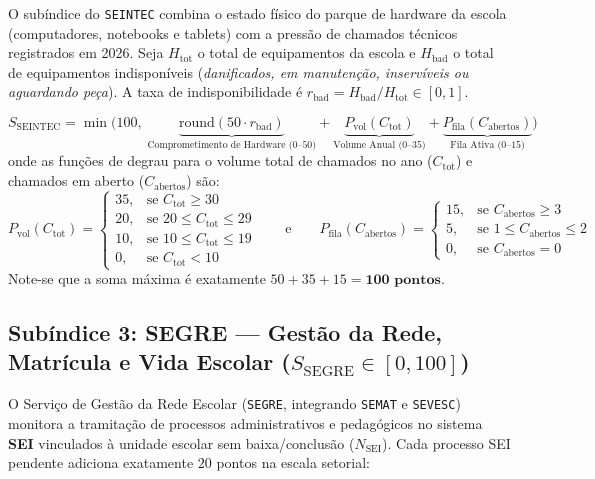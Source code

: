 \documentclass[9pt,a4paper]{extarticle}
\begin{document}
O subíndice do \texttt{SEINTEC} combina o estado físico do parque de hardware da escola (computadores, notebooks e tablets) com a pressão de chamados técnicos registrados em 2026. Seja $H_{\text{tot}}$ o total de equipamentos da escola e $H_{\text{bad}}$ o total de equipamentos indisponíveis (\emph{danificados, em manutenção, inservíveis ou aguardando peça}). A taxa de indisponibilidade é $r_{\text{bad}} = H_{\text{bad}} / H_{\text{tot}} \in [0, 1]$.

\begin{equation}
S_{\text{SEINTEC}} = \min\Big(100, \; \underbrace{\text{round}(50 \cdot r_{\text{bad}})}_{\text{Comprometimento de Hardware (0--50)}} + \underbrace{P_{\text{vol}}(C_{\text{tot}})}_{\text{Volume Anual (0--35)}} + \underbrace{P_{\text{fila}}(C_{\text{abertos}})}_{\text{Fila Ativa (0--15)}}\Big)
\end{equation}
onde as funções de degrau para o volume total de chamados no ano ($C_{\text{tot}}$) e chamados em aberto ($C_{\text{abertos}}$) são:
\begin{equation}
P_{\text{vol}}(C_{\text{tot}}) = \begin{cases} 35, & \text{se } C_{\text{tot}} \ge 30 \\ 20, & \text{se } 20 \le C_{\text{tot}} \le 29 \\ 10, & \text{se } 10 \le C_{\text{tot}} \le 19 \\ 0, & \text{se } C_{\text{tot}} < 10 \end{cases}
\qquad \text{e} \qquad
P_{\text{fila}}(C_{\text{abertos}}) = \begin{cases} 15, & \text{se } C_{\text{abertos}} \ge 3 \\ 5, & \text{se } 1 \le C_{\text{abertos}} \le 2 \\ 0, & \text{se } C_{\text{abertos}} = 0 \end{cases}
\end{equation}
Note-se que a soma máxima é exatamente $50 + 35 + 15 = \mathbf{100\text{ pontos}}$.

\subsection{Subíndice 3: SEGRE --- Gestão da Rede, Matrícula e Vida Escolar ($S_{\text{SEGRE}} \in [0, 100]$)}

O Serviço de Gestão da Rede Escolar (\texttt{SEGRE}, integrando \texttt{SEMAT} e \texttt{SEVESC}) monitora a tramitação de processos administrativos e pedagógicos no sistema \textbf{SEI} vinculados à unidade escolar sem baixa/conclusão ($N_{\text{SEI}}$). Cada processo SEI pendente adiciona exatamente $20$ pontos na escala setorial:
\end{document}
